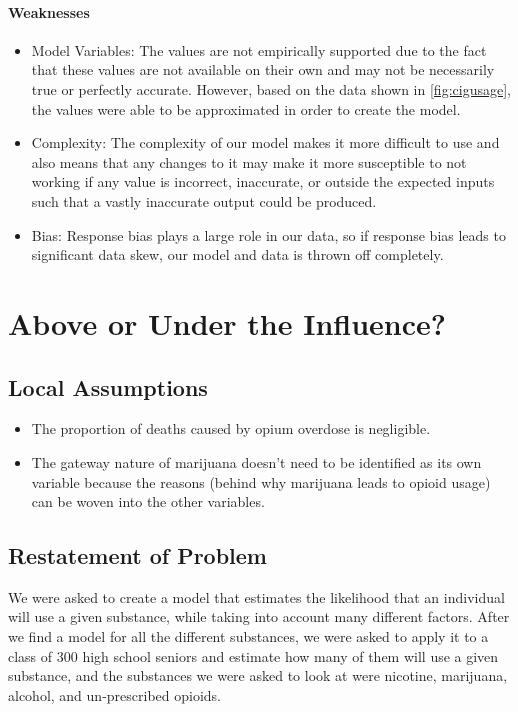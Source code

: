 \documentclass[12pt,letterpaper]{article}
\begin{document}
\paragraph{Weaknesses}
\begin{itemize}
\item Model Variables: The values are not empirically supported due to the fact that these values are not available on their own and may not be necessarily true or perfectly accurate. However, based on the data shown in \ref{fig:cigusage}, the values were able to be approximated in order to create the model. 
\item Complexity: The complexity of our model makes it more difficult to use and also means that any changes to it may make it more susceptible to not working if any value is incorrect, inaccurate, or outside the expected inputs such that a vastly inaccurate output could be produced.
\item Bias: Response bias plays a large role in our data, so if response bias leads to significant data skew, our model and data is thrown off completely.
\end{itemize}

\section{Above or Under the Influence?}

\subsection{Local Assumptions}

\begin{itemize}
  \item The proportion of deaths caused by opium overdose is negligible.
  \item The gateway nature of marijuana doesn’t need to be identified as its own variable because the reasons (behind why marijuana leads to opioid usage) can be woven into the other variables.
\end{itemize}

\subsection{Restatement of Problem}
We were asked to create a model that estimates the likelihood that an individual will use a given substance, while taking into account many different factors. After we find a model for all the different substances, we were asked to apply it to a class of 300 high school seniors and estimate how many of them will use a given substance, and the substances we were asked to look at were nicotine, marijuana, alcohol, and un-prescribed opioids.
\end{document}
